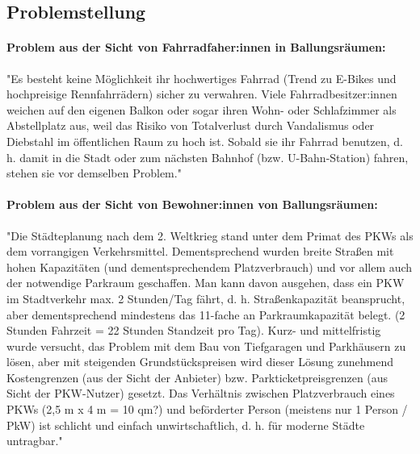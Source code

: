 \subsection{Problemstellung}

\paragraph{Problem aus der Sicht von Fahrradfaher:innen in Ballungsräumen:}
"Es besteht keine Möglichkeit ihr hochwertiges Fahrrad (Trend zu E-Bikes und hochpreisige Rennfahrrädern) sicher zu verwahren. Viele Fahrradbesitzer:innen weichen auf den eigenen Balkon oder sogar ihren Wohn- oder Schlafzimmer als Abstellplatz aus, weil das Risiko von Totalverlust durch Vandalismus oder Diebstahl im öffentlichen Raum zu hoch ist. Sobald sie ihr Fahrrad benutzen, d. h. damit in die Stadt oder zum nächsten Bahnhof (bzw. U-Bahn-Station) fahren, stehen sie vor demselben Problem." \cite{ltw_problemstellung}

\paragraph{Problem aus der Sicht von Bewohner:innen von Ballungsräumen:}
"Die Städteplanung nach dem 2. Weltkrieg stand unter dem Primat des PKWs als dem vorrangigen Verkehrsmittel. Dementsprechend wurden breite Straßen mit hohen Kapazitäten (und dementsprechendem Platzverbrauch) und vor allem auch der notwendige Parkraum geschaffen. Man kann davon ausgehen, dass ein PKW im Stadtverkehr max. 2 Stunden/Tag fährt, d. h. Straßenkapazität beansprucht, aber dementsprechend mindestens das 11-fache an Parkraumkapazität belegt. (2 Stunden Fahrzeit = 22 Stunden Standzeit pro Tag). Kurz- und mittelfristig wurde versucht, das Problem mit dem Bau von Tiefgaragen und Parkhäusern zu lösen, aber mit steigenden Grundstückspreisen wird dieser Lösung zunehmend Kostengrenzen (aus der Sicht der Anbieter) bzw. Parkticketpreisgrenzen (aus Sicht der PKW-Nutzer) gesetzt. Das Verhältnis zwischen Platzverbrauch eines PKWs (2,5 m x 4 m = 10 qm?) und beförderter Person (meistens nur 1 Person / PkW) ist schlicht und einfach unwirtschaftlich, d. h. für moderne Städte untragbar." \cite{ltw_problemstellung}
